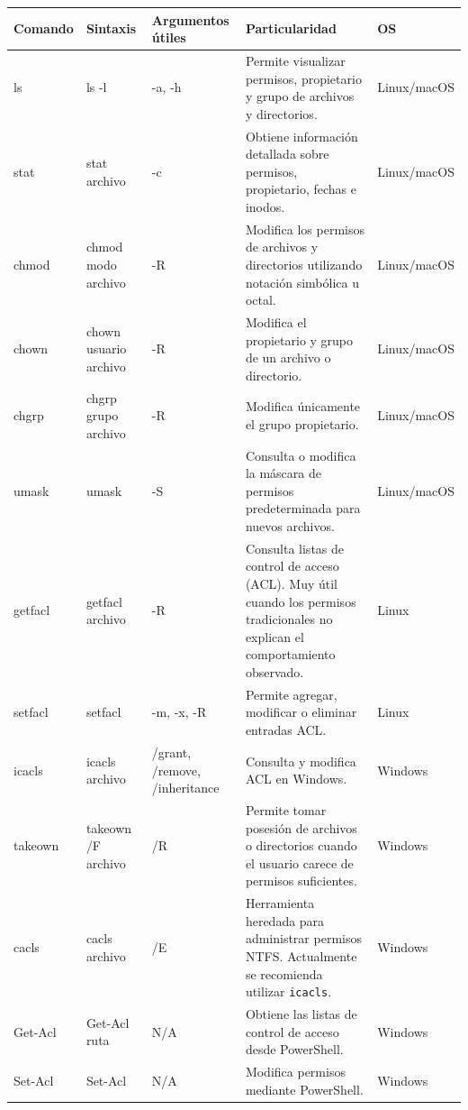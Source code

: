 \documentclass[a4paper,10pt]{article}
\begin{document}
\begin{longtable}{|p{2.8cm}|p{3cm}|p{4cm}|p{5.6cm}|p{1.5cm}|}

\hline
Comando &
Sintaxis &
Argumentos útiles &
Particularidad &
OS
\\
\hline
\endhead

ls &
ls -l &
-a, -h &
Permite visualizar permisos, propietario y grupo de archivos y directorios. &
Linux/macOS
\\
\hline

stat &
stat archivo &
-c &
Obtiene información detallada sobre permisos, propietario, fechas e inodos. &
Linux/macOS
\\
\hline

chmod &
chmod modo archivo &
-R &
Modifica los permisos de archivos y directorios utilizando notación simbólica u octal. &
Linux/macOS
\\
\hline

chown &
chown usuario archivo &
-R &
Modifica el propietario y grupo de un archivo o directorio. &
Linux/macOS
\\
\hline

chgrp &
chgrp grupo archivo &
-R &
Modifica únicamente el grupo propietario. &
Linux/macOS
\\
\hline

umask &
umask &
-S &
Consulta o modifica la máscara de permisos predeterminada para nuevos archivos. &
Linux/macOS
\\
\hline

getfacl &
getfacl archivo &
-R &
Consulta listas de control de acceso (ACL). Muy útil cuando los permisos tradicionales no explican el comportamiento observado. &
Linux
\\
\hline

setfacl &
setfacl &
-m, -x, -R &
Permite agregar, modificar o eliminar entradas ACL. &
Linux
\\
\hline

icacls &
icacls archivo &
/grant, /remove, /inheritance &
Consulta y modifica ACL en Windows. &
Windows
\\
\hline

takeown &
takeown /F archivo &
/R &
Permite tomar posesión de archivos o directorios cuando el usuario carece de permisos suficientes. &
Windows
\\
\hline

cacls &
cacls archivo &
/E &
Herramienta heredada para administrar permisos NTFS. Actualmente se recomienda utilizar \texttt{icacls}. &
Windows
\\
\hline

Get-Acl &
Get-Acl ruta &
N/A &
Obtiene las listas de control de acceso desde PowerShell. &
Windows
\\
\hline

Set-Acl &
Set-Acl &
N/A &
Modifica permisos mediante PowerShell. &
Windows
\\
\hline

\end{longtable}
\end{document}
